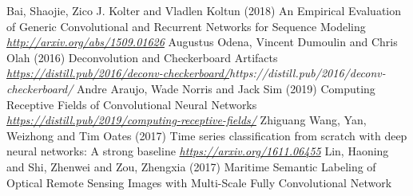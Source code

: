 \begin{vbframe}
{\begin{thebibliography}{99}
 Bai, Shaojie,  Zico J. Kolter and Vladlen Koltun (2018)
\newblock An Empirical Evaluation of Generic Convolutional and Recurrent Networks for Sequence Modeling
\newblock \emph{\url{http://arxiv.org/abs/1509.01626}}
 Augustus Odena, Vincent Dumoulin and Chris Olah (2016)
\newblock Deconvolution and Checkerboard Artifacts
\newblock \emph{\url{https://distill.pub/2016/deconv-checkerboard/}{https://distill.pub/2016/deconv-checkerboard/}}
 Andre Araujo, Wade Norris and Jack Sim (2019)
\newblock Computing Receptive Fields of Convolutional Neural Networks
\newblock \emph{\url{https://distill.pub/2019/computing-receptive-fields/}}
 Zhiguang Wang, Yan, Weizhong and Tim Oates (2017)
\newblock Time series classification from scratch with deep neural networks: A
strong baseline
\newblock \emph{\url{https://arxiv.org/1611.06455}}
 Lin, Haoning and Shi, Zhenwei and Zou, Zhengxia (2017)
\newblock Maritime Semantic Labeling of Optical Remote Sensing Images with Multi-Scale Fully Convolutional Network

\end{thebibliography}
}
\end{vbframe}




\endlecture
